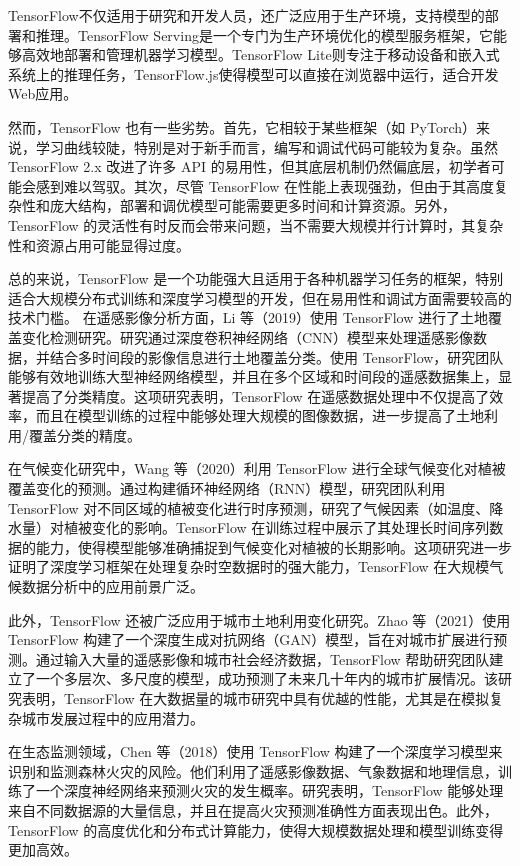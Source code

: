 \documentclass[AutoFakeBold]{LZUThesis-PgD&PhD}
\begin{document}
	TensorFlow不仅适用于研究和开发人员，还广泛应用于生产环境，支持模型的部署和推理。TensorFlow Serving是一个专门为生产环境优化的模型服务框架，它能够高效地部署和管理机器学习模型。TensorFlow Lite则专注于移动设备和嵌入式系统上的推理任务，TensorFlow.js使得模型可以直接在浏览器中运行，适合开发Web应用。
	

	然而，TensorFlow 也有一些劣势。首先，它相较于某些框架（如 PyTorch）来说，学习曲线较陡，特别是对于新手而言，编写和调试代码可能较为复杂。虽然 TensorFlow 2.x 改进了许多 API 的易用性，但其底层机制仍然偏底层，初学者可能会感到难以驾驭。其次，尽管 TensorFlow 在性能上表现强劲，但由于其高度复杂性和庞大结构，部署和调优模型可能需要更多时间和计算资源。另外，TensorFlow 的灵活性有时反而会带来问题，当不需要大规模并行计算时，其复杂性和资源占用可能显得过度。
	
	总的来说，TensorFlow 是一个功能强大且适用于各种机器学习任务的框架，特别适合大规模分布式训练和深度学习模型的开发，但在易用性和调试方面需要较高的技术门槛。
	在遥感影像分析方面，Li 等（2019）使用 TensorFlow 进行了土地覆盖变化检测研究\cite{li2019}。研究通过深度卷积神经网络（CNN）模型来处理遥感影像数据，并结合多时间段的影像信息进行土地覆盖分类。使用 TensorFlow，研究团队能够有效地训练大型神经网络模型，并且在多个区域和时间段的遥感数据集上，显著提高了分类精度。这项研究表明，TensorFlow 在遥感数据处理中不仅提高了效率，而且在模型训练的过程中能够处理大规模的图像数据，进一步提高了土地利用/覆盖分类的精度。
	
	在气候变化研究中，Wang 等（2020）利用 TensorFlow 进行全球气候变化对植被覆盖变化的预测\cite{wang2020H}。通过构建循环神经网络（RNN）模型，研究团队利用 TensorFlow 对不同区域的植被变化进行时序预测，研究了气候因素（如温度、降水量）对植被变化的影响。TensorFlow 在训练过程中展示了其处理长时间序列数据的能力，使得模型能够准确捕捉到气候变化对植被的长期影响。这项研究进一步证明了深度学习框架在处理复杂时空数据时的强大能力，TensorFlow 在大规模气候数据分析中的应用前景广泛。
	
	此外，TensorFlow 还被广泛应用于城市土地利用变化研究。Zhao 等（2021）使用 TensorFlow 构建了一个深度生成对抗网络（GAN）模型，旨在对城市扩展进行预测\cite{zhao2021}。通过输入大量的遥感影像和城市社会经济数据，TensorFlow 帮助研究团队建立了一个多层次、多尺度的模型，成功预测了未来几十年内的城市扩展情况。该研究表明，TensorFlow 在大数据量的城市研究中具有优越的性能，尤其是在模拟复杂城市发展过程中的应用潜力。
	
	在生态监测领域，Chen 等（2018）使用 TensorFlow 构建了一个深度学习模型来识别和监测森林火灾的风险\cite{chen2018}。他们利用了遥感影像数据、气象数据和地理信息，训练了一个深度神经网络来预测火灾的发生概率。研究表明，TensorFlow 能够处理来自不同数据源的大量信息，并且在提高火灾预测准确性方面表现出色。此外，TensorFlow 的高度优化和分布式计算能力，使得大规模数据处理和模型训练变得更加高效。
	
\end{document}

